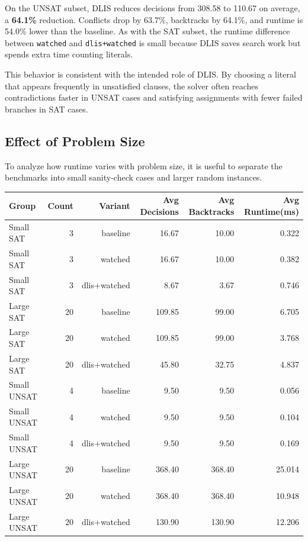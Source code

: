 \documentclass[11pt]{article}
\begin{document}
On the UNSAT subset, DLIS reduces decisions from 308.58 to 110.67 on average,
a \textbf{64.1\%} reduction. Conflicts drop by 63.7\%, backtracks by 64.1\%,
and runtime is 54.0\% lower than the baseline. As with the SAT subset, the
runtime difference between \texttt{watched} and \texttt{dlis+watched} is small
because DLIS saves search work but spends extra time counting literals.

This behavior is consistent with the intended role of DLIS. By choosing a
literal that appears frequently in unsatisfied clauses, the solver often
reaches contradictions faster in UNSAT cases and satisfying assignments with
fewer failed branches in SAT cases.

\subsection{Effect of Problem Size}

To analyze how runtime varies with problem size, it is useful to separate the
benchmarks into small sanity-check cases and larger random instances.

\begin{center}
\small
\renewcommand{\arraystretch}{1.08}
\begin{tabular}{|l|r|r|r|r|r|}
\hline
\textbf{Group} & \textbf{Count} & \textbf{Variant} & \textbf{Avg Decisions} & \textbf{Avg Backtracks} & \textbf{Avg Runtime(ms)} \\
\hline
Small SAT & 3 & baseline & 16.67 & 10.00 & 0.322 \\
Small SAT & 3 & watched & 16.67 & 10.00 & 0.382 \\
Small SAT & 3 & dlis+watched & 8.67 & 3.67 & 0.746 \\
\hline
Large SAT & 20 & baseline & 109.85 & 99.00 & 6.705 \\
Large SAT & 20 & watched & 109.85 & 99.00 & 3.768 \\
Large SAT & 20 & dlis+watched & 45.80 & 32.75 & 4.837 \\
\hline
Small UNSAT & 4 & baseline & 9.50 & 9.50 & 0.056 \\
Small UNSAT & 4 & watched & 9.50 & 9.50 & 0.104 \\
Small UNSAT & 4 & dlis+watched & 9.50 & 9.50 & 0.169 \\
\hline
Large UNSAT & 20 & baseline & 368.40 & 368.40 & 25.014 \\
Large UNSAT & 20 & watched & 368.40 & 368.40 & 10.948 \\
Large UNSAT & 20 & dlis+watched & 130.90 & 130.90 & 12.206 \\
\hline
\end{tabular}
\end{center}
\end{document}

